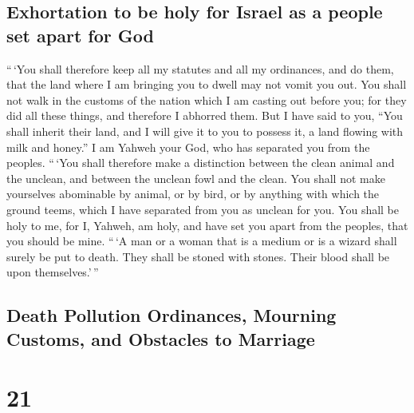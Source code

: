 \hypertarget{exhortation-to-be-holy-for-israel-as-a-people-set-apart-for-god}{%
\subsection{Exhortation to be holy for Israel as a people set apart for
God}\label{exhortation-to-be-holy-for-israel-as-a-people-set-apart-for-god}}

 ``\,`You shall therefore keep all my statutes and all my
ordinances, and do them, that the land where I am bringing you to dwell
may not vomit you out.  You shall not walk in the customs
of the nation which I am casting out before you; for they did all these
things, and therefore I abhorred them.  But I have said
to you, ``You shall inherit their land, and I will give it to you to
possess it, a land flowing with milk and honey.'' I am Yahweh your God,
who has separated you from the peoples.  ``\,`You shall
therefore make a distinction between the clean animal and the unclean,
and between the unclean fowl and the clean. You shall not make
yourselves abominable by animal, or by bird, or by anything with which
the ground teems, which I have separated from you as unclean for you.
 You shall be holy to me, for I, Yahweh, am holy, and
have set you apart from the peoples, that you should be mine.
 ``\,`A man or a woman that is a medium or is a wizard
shall surely be put to death. They shall be stoned with stones. Their
blood shall be upon themselves.'\,''

\hypertarget{death-pollution-ordinances-mourning-customs-and-obstacles-to-marriage}{%
\subsection{Death Pollution Ordinances, Mourning Customs, and Obstacles
to
Marriage}\label{death-pollution-ordinances-mourning-customs-and-obstacles-to-marriage}}

\hypertarget{section-20}{%
\section{21}\label{section-20}}

